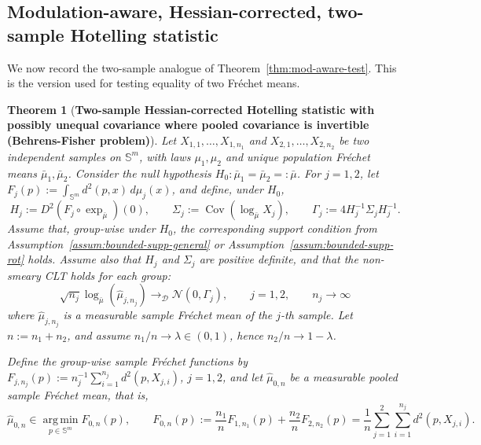 \documentclass{amsart}
\newtheorem{theorem}{Theorem}[section]
\theoremstyle{definition}
\theoremstyle{remark}
\newcommand\0{\boldsymbol{0}}
\begin{document}
\subsection{Modulation-aware, Hessian-corrected, two-sample Hotelling statistic}

We now record the two-sample analogue of Theorem~\ref{thm:mod-aware-test}. This is the version used for testing equality of two Fréchet means.

\begin{theorem}[\textbf{Two-sample Hessian-corrected Hotelling statistic with possibly unequal covariance where pooled covariance is invertible (Behrens-Fisher problem)}]
\label{thm:two-sample-mod-aware-hotelling}
Let \(X_{1,1},\dots,X_{1,n_1}\) and \(X_{2,1},\dots,X_{2,n_2}\) be two independent samples on \(\mathbb S^m\), with laws \(\mu_1,\mu_2\) and unique population Fr\'echet means \(\bar\mu_1,\bar\mu_2\).  Consider the null hypothesis \(H_0:\bar\mu_1=\bar\mu_2=:\bar\mu\).  For \(j=1,2\), let \(F_j(p):=\int_{\mathbb S^m}d^2(p,x)\,d\mu_j(x)\), and define, under \(H_0\),
\[
H_j:=D^2(F_j\circ\exp_{\bar\mu})(0),
\qquad
\Sigma_j:=\operatorname{Cov}(\log_{\bar\mu}X_j),
\qquad
\Gamma_j:=4H_j^{-1}\Sigma_jH_j^{-1}.
\]
Assume that, group-wise under \(H_0\), the corresponding support condition from Assumption~\ref{assum:bounded-supp-general} or Assumption~\ref{assum:bounded-supp-rot} holds.  Assume also that \(H_j\) and \(\Sigma_j\) are positive definite, and that the non-smeary CLT holds for each group:
\[
\sqrt{n_j}\log_{\bar\mu}(\hat\mu_{j,n_j})
\rightarrow_{\mathcal D}
\mathcal N(0,\Gamma_j),
\qquad j=1,2,
\qquad n_j \to \infty
\]
where \(\hat\mu_{j,n_j}\) is a measurable sample Fr\'echet mean of the \(j\)-th sample.  Let \(n:=n_1+n_2\), and assume \(n_1/n\to\lambda\in(0,1)\), hence \(n_2/n\to1-\lambda\).

Define the group-wise sample Fréchet functions by \(F_{j,n_j}(p):=n_j^{-1}\sum_{i=1}^{n_j}d^2(p,X_{j,i})\), \(j=1,2\), and let \(\hat\mu_{0,n}\) be a measurable pooled sample Fr\'echet mean, that is,
\[
\hat\mu_{0,n}\in \operatorname*{arg\,min}_{p\in\mathbb S^m} F_{0,n}(p),
\qquad
F_{0,n}(p):=\frac{n_1}{n}F_{1,n_1}(p)+\frac{n_2}{n}F_{2,n_2}(p)
=\frac1n\sum_{j=1}^2\sum_{i=1}^{n_j}d^2(p,X_{j,i}).
\]
  

\end{theorem}
\end{document}
